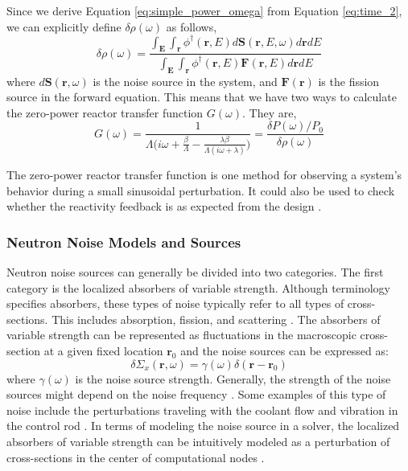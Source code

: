 Since we derive Equation \ref{eq:simple_power_omega} from Equation \ref{eq:time_2}, we can explicitly define $\delta \rho(\omega)$ as follows,
\begin{equation}
        \delta \rho(\omega) = \frac{\int_{\textbf{E}} \int_{\textbf{r}} \phi^{\dagger}(\textbf{r}, E) d\textbf{S}(\textbf{r}, E, \omega) d\textbf{r} dE}{\int_{\textbf{E}} \int_{\textbf{r}} \phi^{\dagger}(\textbf{r}, E) \textbf{F}(\textbf{r}, E) d\textbf{r} dE}
\end{equation}
where $d\textbf{S}(\textbf{r}, \omega)$ is the noise source in the system, and $\textbf{F}(\textbf{r})$  is the fission source in the forward equation. This means that we have two ways to calculate the zero-power reactor transfer function $G(\omega)$. They are,
\begin{equation}
        G(\omega) = \frac{1}{\Lambda \biggl( i \omega +  \frac{\beta}{\Lambda} - \frac{\lambda \beta}{\Lambda (i \omega + \lambda)} \biggr)} = \frac{\delta P (\omega) /P_0}{\delta \rho(\omega)}
\end{equation}

The zero-power reactor transfer function is one method for observing a system's behavior during a small sinusoidal perturbation. It could also be used to check whether the reactivity feedback is as expected from the design \cite{bellNuclearReactorTheory1970}.

\subsubsection{Neutron Noise Models and Sources}

Neutron noise sources can generally be divided into two categories. The first category is the localized absorbers of variable strength. Although terminology specifies absorbers, these types of noise typically refer to all types of cross-sections. This includes absorption, fission, and scattering \cite{pazsitNoiseTechniquesNuclear2010}. The absorbers of variable strength can be represented as fluctuations in the macroscopic cross-section at a given fixed location $\textbf{r}_0$ and the noise sources can be expressed as:
\begin{equation}
        \delta \Sigma_x (\textbf{r}, \omega) = \gamma (\omega) \delta (\textbf{r} - \textbf{r}_0)
\end{equation}
where $\gamma (\omega)$ is the noise source strength. Generally, the strength of the noise sources might depend on the noise frequency \cite{pazsitNoiseTechniquesNuclear2010}. Some examples of this type of noise include the perturbations traveling with the coolant flow \cite{jonssonTwogroupTheoryNeutron2011} and vibration in the control rod \cite{pazsitNeutronNoiseDiagnostics1983}. In terms of modeling the noise source in a solver, the localized absorbers of variable strength can be intuitively modeled as a perturbation of cross-sections in the center of computational nodes \cite{mylonakisCORESIMFlexible2021}.

